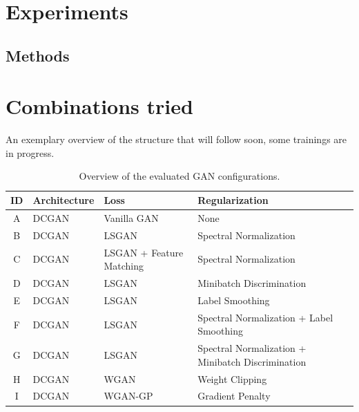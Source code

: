 \section{Experiments}
\label{sec:experiments}

\subsection{Methods}
\label{sec:methods}

\section{Combinations tried}
\label{sec:combinations_tried}
An exemplary overview of the structure that will follow soon, some trainings are in progress.

\begin{table}[H]
    \centering
    \caption{Overview of the evaluated GAN configurations.}
    \label{tab:gan_configurations}
    \begin{tabular}{c l l l}
        \toprule
        ID & Architecture & Loss & Regularization \\
        \midrule
        A & DCGAN & Vanilla GAN & None \\
        B & DCGAN & LSGAN & Spectral Normalization \\
        C & DCGAN & LSGAN + Feature Matching & Spectral Normalization \\
        D & DCGAN & LSGAN & Minibatch Discrimination \\
        E & DCGAN & LSGAN & Label Smoothing \\
        F & DCGAN & LSGAN & Spectral Normalization + Label Smoothing \\
        G & DCGAN & LSGAN & Spectral Normalization + Minibatch Discrimination \\
        H & DCGAN & WGAN & Weight Clipping \\
        I & DCGAN & WGAN-GP & Gradient Penalty \\
        \bottomrule
    \end{tabular}
\end{table}

